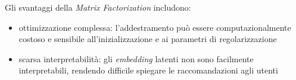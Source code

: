 Gli svantaggi della \textit{Matrix Factorization} includono:

\begin{itemize}
    \item ottimizzazione complessa: l'addestramento può essere computazionalmente costoso e sensibile all'inizializzazione e ai parametri di regolarizzazione
    \item scarsa interpretabilità: gli \textit{embedding} latenti non sono facilmente interpretabili, rendendo difficile spiegare le raccomandazioni agli utenti
\end{itemize}